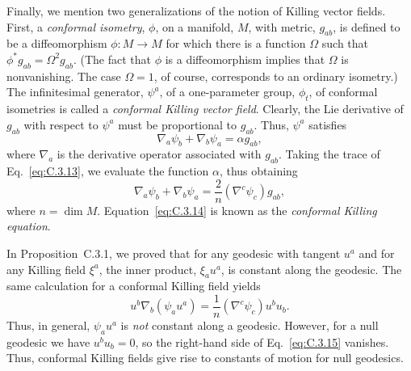 Finally, we mention two generalizations of the notion of Killing vector fields.
First, a \emph{conformal isometry}, \(\phi\), on a manifold, \(M\), with metric,
\(g_{ab}\), is defined to be a diffeomorphism \(\phi:M\to M\) for which there is a
function \(\Omega\) such that \(\phi^*g_{ab}=\Omega^2g_{ab}\). (The fact that
\(\phi\) is a diffeomorphism implies that \(\Omega\) is nonvanishing. The case
\(\Omega=1\), of course, corresponds to an ordinary isometry.) The infinitesimal
generator, \(\psi^a\), of a one-parameter group, \(\phi_t\), of conformal isometries
is called a \emph{conformal Killing vector field}. Clearly, the Lie derivative of
\(g_{ab}\) with respect to \(\psi^a\) must be proportional to \(g_{ab}\). Thus,
\(\psi^a\) satisfies
\begin{equation}
  \nabla_a\psi_b+\nabla_b\psi_a=\alpha g_{ab},
  \tag{C.3.13}\label{eq:C.3.13}
\end{equation}
where \(\nabla_a\) is the derivative operator associated with \(g_{ab}\). Taking the
trace of Eq.~\eqref{eq:C.3.13}, we evaluate the function \(\alpha\), thus obtaining
\begin{equation}
  \nabla_a\psi_b+\nabla_b\psi_a
  =\frac{2}{n}(\nabla^c\psi_c)g_{ab},
  \tag{C.3.14}\label{eq:C.3.14}
\end{equation}
where \(n=\dim M\). Equation~\eqref{eq:C.3.14} is known as the \emph{conformal
Killing equation}.

In Proposition~C.3.1, we proved that for any geodesic with tangent \(u^a\) and for
any Killing field \(\xi^a\), the inner product, \(\xi_au^a\), is constant along the
geodesic. The same calculation for a conformal Killing field yields
\begin{equation}
  u^b\nabla_b(\psi_au^a)=\frac{1}{n}(\nabla^c\psi_c)u^bu_b.
  \tag{C.3.15}\label{eq:C.3.15}
\end{equation}
Thus, in general, \(\psi_au^a\) is \emph{not} constant along a geodesic. However,
for a null geodesic we have \(u^bu_b=0\), so the right-hand side of
Eq.~\eqref{eq:C.3.15} vanishes. Thus, conformal Killing fields give rise to constants
of motion for null geodesics.

